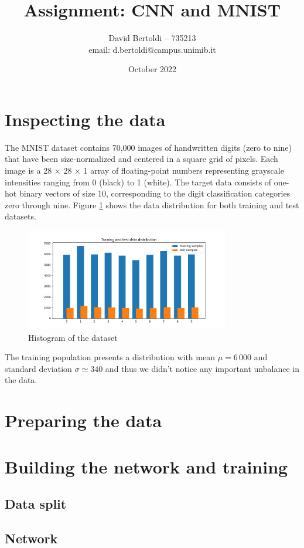 \documentclass[compsoc]{IEEEtran}
\title{Assignment: CNN and MNIST}
\author{David Bertoldi -- 735213 \\ email: d.bertoldi@campus.unimib.it}
\affil{Department of Informatics, Systems and Communication}
\affil{University of Milano-Bicocca}
\date{October 2022}
\begin{document}
\maketitle 



\section{Inspecting the data}
The MNIST dataset contains 70,000 images of handwritten digits (zero to nine) that have been size-normalized and centered in a square grid of pixels. Each image is a 28 × 28 × 1 array of floating-point numbers representing grayscale intensities ranging from 0 (black) to 1 (white). The target data consists of one-hot binary vectors of size 10, corresponding to the digit classification categories zero through nine. Figure \ref{fig:hist} shows the data distribution for both training and test datasets.

\begin{figure}[ht!]
\centering                                                                        
\includegraphics[width=3.5in]{hist.png}
\captionsetup{justification=centering}                                                                                                                                   
\caption{Histogram of the dataset}
\label{fig:hist}                                                                                                                                                           
\end{figure}


The training population presents a distribution with mean $\mu = 6\,000$ and standard deviation $\sigma \simeq 340$ and thus we didn't notice any important unbalance in the data.

\section{Preparing the data}

\section{Building the network and training}
\subsection{Data split}


\subsection{Network}
\end{document}
